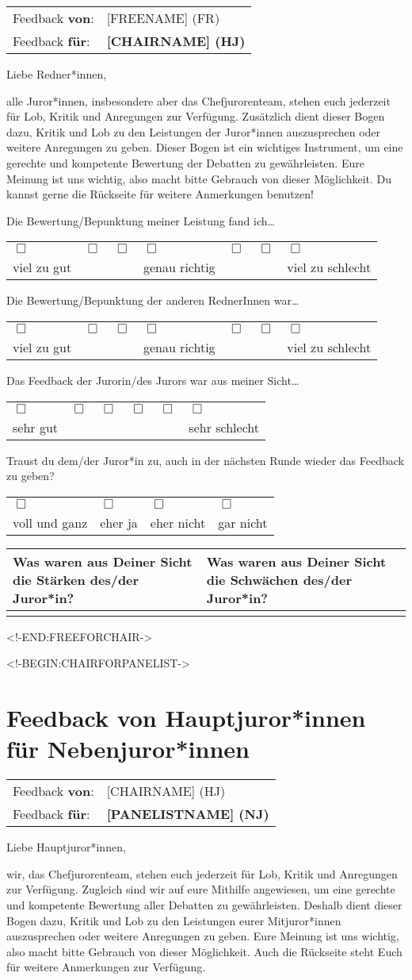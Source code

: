\documentclass{scrartcl}
\newcommand{\questionsix}[3]{%
#3%

\medskip%

{%
  \centering%
  \begin{tabular}{>{\centering}p{0.13\textwidth}%
                  >{\centering}p{0.13\textwidth}%
                  >{\centering}p{0.13\textwidth}%
                  >{\centering}p{0.13\textwidth}%
                  >{\centering}p{0.13\textwidth}%
                  >{\centering\arraybackslash}p{0.13\textwidth}}%
    $\Box$ & $\Box$ & $\Box$ & $\Box$ & $\Box$ & $\Box$ \\%
    #1 & & & & & #2%
  \end{tabular}%
}%
}
\newcommand{\questionseven}[4]{%
#4%

\medskip%

{%
  \centering%
  \begin{tabular}{>{\centering}p{0.11\textwidth}%
                  >{\centering}p{0.11\textwidth}%
                  >{\centering}p{0.11\textwidth}%
                  >{\centering}p{0.11\textwidth}%
                  >{\centering}p{0.11\textwidth}%
                  >{\centering}p{0.11\textwidth}%
                  >{\centering\arraybackslash}p{0.11\textwidth}}%
    $\Box$ & $\Box$ & $\Box$ & $\Box$ & $\Box$ & $\Box$ & $\Box$ \\%
    #1 & & & #2 & & & #3%
  \end{tabular}%
}%
}
\newcommand{\questionfour}[1]{%
#1%

\medskip%

{%
  \centering%
  \begin{tabular}{>{\centering}p{0.23\textwidth}%
                  >{\centering}p{0.23\textwidth}%
                  >{\centering}p{0.23\textwidth}%
                  >{\centering\arraybackslash}p{0.23\textwidth}}%
    $\Box$ & $\Box$ & $\Box$ & $\Box$ \\%
    voll und ganz & eher ja & eher nicht & gar nicht %
  \end{tabular}%
}%
}
\newcommand{\strengthsandweaknesses}[1]{%
{%
  \centering%
  \begin{tabular}{|p{0.45\textwidth}|p{0.45\textwidth}|}%
    \hline%
    Was waren aus Deiner Sicht die Stärken des/der Juror*in? &%
    Was waren aus Deiner Sicht die Schwächen des/der Juror*in? \\%
    \hline%
    \bigskip & \\[#1]%
    \hline%
  \end{tabular}%
}%
}
\newcommand{\feedbackfromfor}[2]{%
\begin{tabular}{ll}%
  Feedback \textbf{von}: & #1 \\%
  Feedback \textbf{für}: & \textbf{#2}%
\end{tabular}%
}
\begin{document}
    \feedbackfromfor{[FREENAME] (FR)}{[CHAIRNAME] (HJ)}

    \bigskip

    Liebe Redner*innen,

    \medskip

    alle Juror*innen, insbesondere aber das Chefjurorenteam, stehen euch
    jederzeit für Lob, Kritik und Anregungen zur Verfügung. Zusätzlich dient
    dieser Bogen dazu, Kritik und Lob zu den Leistungen der Juror*innen
    auszusprechen oder weitere Anregungen zu geben. Dieser Bogen ist ein
    wichtiges Instrument, um eine gerechte und kompetente Bewertung der
    Debatten zu gewährleisten. Eure Meinung ist uns wichtig, also macht bitte
    Gebrauch von dieser Möglichkeit. Du kannst gerne die Rückseite für weitere
    Anmerkungen benutzen!

    \medskip
    \hrulefill
    \medskip

    \questionseven{viel zu gut}{genau richtig}{viel zu schlecht}{
      Die Bewertung/Bepunktung meiner Leistung fand ich\dots
    }
    \medskip

    \questionseven{viel zu gut}{genau richtig}{viel zu schlecht}{
      Die Bewertung/Bepunktung der anderen RednerInnen war\dots
    }
    \medskip

    \questionsix{sehr gut}{sehr schlecht}{
      Das Feedback der Jurorin/des Jurors war aus meiner Sicht\dots
    }
    \medskip

    \questionfour{
      Traust du dem/der Juror*in zu, auch in der nächsten Runde wieder das
      Feedback zu geben?
    }
    \medskip

    \strengthsandweaknesses{6cm}

    \newpage
  <!-END:FREEFORCHAIR->

  <!-BEGIN:CHAIRFORPANELIST->
    \section*{Feedback von Hauptjuror*innen für Nebenjuror*innen}

    \feedbackfromfor{[CHAIRNAME] (HJ)}{[PANELISTNAME] (NJ)}

    \bigskip

    Liebe Hauptjuror*innen,

    \medskip

    wir, das Chefjurorenteam, stehen euch jederzeit für
    Lob, Kritik und Anregungen zur Verfügung. Zugleich sind wir auf eure
    Mithilfe angewiesen, um eine gerechte und kompetente Bewertung aller
    Debatten zu gewährleisten. Deshalb dient dieser Bogen dazu, Kritik und Lob
    zu den Leistungen eurer Mitjuror*innen auszusprechen oder weitere
    Anregungen zu geben. Eure Meinung ist uns wichtig, also macht bitte
    Gebrauch von dieser Möglichkeit. Auch die Rückseite steht Euch für weitere
    Anmerkungen zur Verfügung.
\end{document}
